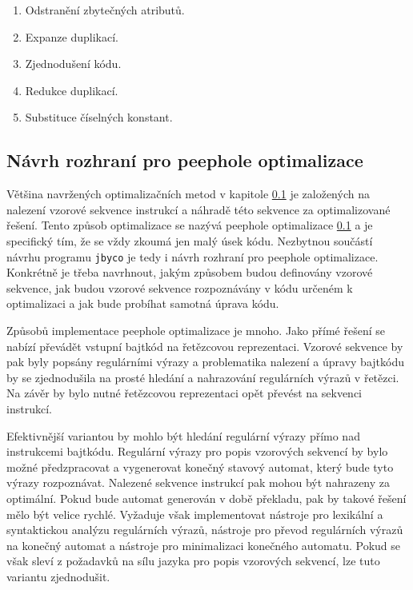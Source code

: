 \begin{enumerate}
\setlength{\itemsep}{0pt}
\setlength{\parskip}{0pt}
\item Odstranění zbytečných atributů.
\item Expanze duplikací. 
\item Zjednodušení kódu.
\item Redukce duplikací.
\item Substituce číselných konstant.
\end{enumerate}


\subsection{Návrh rozhraní pro peephole optimalizace}

Většina navržených optimalizačních metod v kapitole \ref{} je založených na nalezení vzorové sekvence instrukcí a náhradě této sekvence za optimalizované řešení. Tento způsob optimalizace se nazývá peephole optimalizace \ref{} a je specifický tím, že se vždy zkoumá jen malý úsek kódu. Nezbytnou součástí návrhu programu \texttt{jbyco} je tedy i návrh rozhraní pro peephole optimalizace. Konkrétně je třeba navrhnout, jakým způsobem budou definovány vzorové sekvence, jak budou vzorové sekvence rozpoznávány v kódu určeném k optimalizaci a jak bude probíhat samotná úprava kódu.

Způsobů implementace peephole optimalizace je mnoho. Jako přímé řešení se nabízí převádět vstupní bajtkód na řetězcovou reprezentaci. Vzorové sekvence by pak byly popsány regulárními výrazy a problematika nalezení a úpravy bajtkódu by se zjednodušila na prosté hledání a nahrazování regulárních výrazů v řetězci. Na závěr by bylo nutné řetězcovou reprezentaci opět převést na sekvenci instrukcí. 

Efektivnější variantou by mohlo být hledání regulární výrazy přímo nad instrukcemi bajtkódu. Regulární výrazy pro popis vzorových sekvencí by bylo možné předzpracovat a vygenerovat konečný stavový automat, který bude tyto výrazy rozpoznávat. Nalezené sekvence instrukcí pak mohou být nahrazeny za optimální. Pokud bude automat generován v době překladu, pak by takové řešení mělo být velice rychlé. Vyžaduje však implementovat nástroje pro lexikální a syntaktickou analýzu regulárních výrazů, nástroje pro převod regulárních výrazů na konečný automat a nástroje pro minimalizaci konečného automatu. Pokud se však sleví z požadavků na sílu jazyka pro popis vzorových sekvencí, lze tuto variantu zjednodušit.

